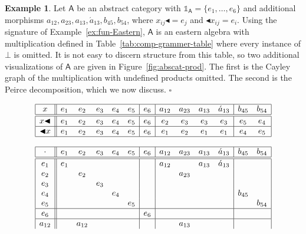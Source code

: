 \documentclass{amsart}
\newcommand{\acat}[1]{\mathsf{#1}}
\numberwithin{lstfloat}{section}
\newcommand{\srcfunc}{\mathbin{\blacktriangleleft}}
\newcommand{\tgtfunc}{\mathbin{\blacktriangleleft}}
\newcommand{\src}[1]{#1\srcfunc}
\newcommand{\tgt}[1]{\tgtfunc #1}
\newcommand{\one}{\mathbb{1}}
\newcommand{\exqed}{\hfill $\square$}
\theoremstyle{definition}
\newtheorem{ex}[thm]{Example}
\theoremstyle{remark}
\numberwithin{equation}{section}
\begin{document}
\begin{ex}\label{ex:abscat}
  Let $\acat{A}$ be an abstract category with
  $\one_{\acat{A}}=\{e_1,\ldots,e_6\}$ and additional morphisms
  $a_{12},a_{23},a_{13},\acute{a}_{13},b_{45},b_{54}$, where $\src{x_{ij}} =
  e_j$ and $\tgt{x_{ij}}=e_i$.  Using the signature of Example~\ref{ex:fun-Eastern},
  $\acat{A}$ is an eastern algebra with multiplication defined in
  Table~\ref{tab:comp-grammer-table} where every instance of $\bot$ is omitted. 
It is not easy
  to discern structure from this table, so two additional visualizations of
  $\acat{A}$ are given in Figure~\ref{fig:abscat-prod}. The first is the Cayley graph
  of the multiplication with undefined products omitted. The second is the
  Peirce decomposition, which we now discuss. \exqed

\begin{table}[h]
  \begin{align*}
    \begin{array}{|c||ccccc|c|cccc|cc|}\hline
     x& e_1 & e_2 & e_3 & e_4 & e_5 & e_6 & a_{12} & a_{23} & a_{13} & \acute{a}_{13} & b_{45} & b_{54}\\\hline\hline
       \src{x}   & e_1 & e_2 & e_3 & e_4 & e_5 & e_6 & e_2 & e_3 & e_3 & e_3 & e_5& e_4 \\\hline
       \tgt{x}  & e_1&e_2&e_3&e_4&e_5& e_6 & e_1 & e_2 & e_1 & e_1 & e_4 & e_5 \\\hline
       \multicolumn{13}{c}{}\\\hline
        \cdot & e_1 & e_2 & e_3 & e_4 & e_5 & e_6 & a_{12} & a_{23} & a_{13} & \acute{a}_{13} & b_{45} & b_{54}\\
      \hline
      \hline 
         e_1 & e_1 &     &     &     &     &     & a_{12}&   & a_{13}& \acute{a}_{13} &   & \\
         e_2 &     & e_2 &     &     &     &     &     & a_{23}&   &   &   & \\
         e_3 &     &     & e_3 &     &     &     &     &     &     &   &   &\\
         e_4 &     &     &     & e_4 &     &     &     &     &     &   & b_{45} &    \\
         e_5 &     &     &     &     & e_5 &     &     &     &     &   &   & b_{54} \\
        \hline
         e_6 &     &     &     &     &     & e_6 &     &     &     &   &   & \\
        \hline
         a_{12}&   & a_{12}&   &     &     &     &     & a_{13}&   &   &   & \\

\end{array}
\end{align*}
\end{table}
\end{ex}
\end{document}
